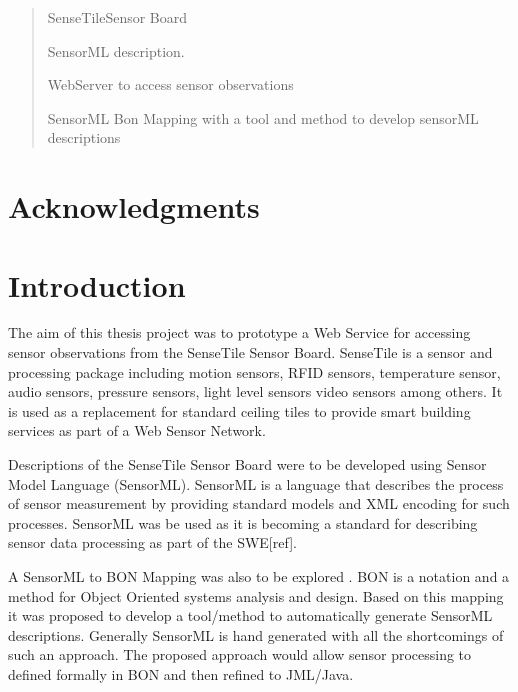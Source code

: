 \documentclass[]{final_report}
\begin{document}
\maketitle
\tableofcontents{}\newpage


\begin{abstract}
SenseTileSensor Board

SensorML description.

WebServer to access sensor observations

SensorML Bon Mapping with a tool and method to develop sensorML descriptions

\end{abstract}




\newpage



\chapter*{Acknowledgments}



\chapter{Introduction}

The aim of this thesis project was to prototype a Web Service for accessing sensor observations from the SenseTile Sensor Board. SenseTile is a sensor and processing package including motion sensors, RFID sensors, temperature sensor, audio sensors, pressure sensors, light level sensors video sensors among others. It is used as a replacement for standard ceiling tiles to provide smart building services as part of a Web Sensor Network.

Descriptions of the SenseTile Sensor Board were to be developed using Sensor Model Language (SensorML)\cite{SensoMLref}. SensorML is a language that describes the process of sensor measurement by providing standard models and XML encoding for such processes. SensorML was be used as it is becoming a standard for describing sensor data processing as part of the SWE[ref].

A  SensorML to BON Mapping was also to be explored . BON\cite{BONref} is a notation and a method for Object Oriented systems analysis and design. Based on this mapping it was proposed to develop a tool/method to automatically generate SensorML descriptions. Generally SensorML is hand generated with all the shortcomings of such an approach. The proposed approach would allow sensor processing to defined formally in BON and then refined to JML/Java. 
\end{document}
